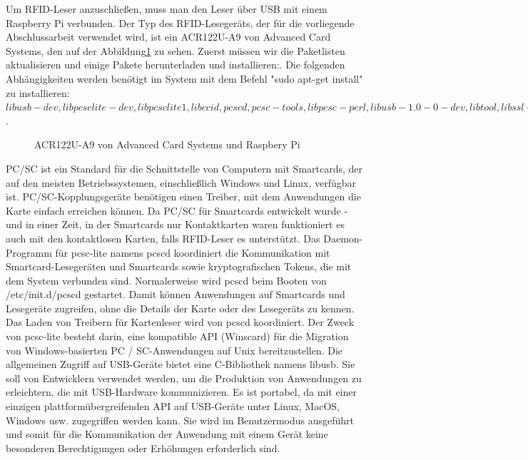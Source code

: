 Um RFID-Leser anzuschließen, muss man den Leser über USB mit einem Raspberry Pi verbunden. Der Typ des RFID-Lesegeräts, der für die vorliegende Abschlussarbeit verwendet wird, ist ein ACR122U-A9 von Advanced Card Systems\cite{website:7}, den auf der Abbildung\ref{fig:rfid_hard} zu sehen. Zuerst müssen wir die Paketlisten aktualisieren und einige Pakete herunterladen und installieren:\cite{website:6}. Die folgenden Abhängigkeiten werden benötigt im System mit dem Befehl "sudo apt-get install" zu installieren: $libusb-dev, libpcsclite-dev, libpcsclite1, libccid, pcscd, pcsc-tools, libpcsc-perl, libusb-1.0-0-dev, libtool, libssl-dev$.\\
\begin{figure}
	\caption{ACR122U-A9 von Advanced Card Systems und Raspbery Pi}
	\label{fig:rfid_hard}
\end{figure}
PC/SC ist ein Standard für die Schnittstelle von Computern mit Smartcards, der auf den meisten Betriebssystemen, einschließlich Windows und Linux, verfügbar ist. PC/SC-Kopplungsgeräte benötigen einen Treiber, mit dem Anwendungen die Karte einfach erreichen können. Da PC/SC für Smartcards entwickelt wurde - und in einer Zeit, in der Smartcards nur Kontaktkarten waren funktioniert es auch mit den kontaktlosen Karten, falls RFID-Leser es unterstützt. Das Daemon-Programm für pcsc-lite namens pcscd koordiniert die Kommunikation mit Smartcard-Lesegeräten und Smartcards sowie kryptografischen Tokens, die mit dem System verbunden sind. Normalerweise wird pcscd beim Booten von /etc/init.d/pcscd gestartet. Damit können Anwendungen auf Smartcards und Lesegeräte zugreifen, ohne die Details der Karte oder des Lesegeräts zu kennen. Das Laden von Treibern für Kartenleser wird von pcscd koordiniert. Der Zweck von pcsc-lite besteht darin, eine kompatible API (Winscard) für die Migration von Windows-basierten PC / SC-Anwendungen auf Unix bereitzustellen\cite{website:5}. Die allgemeinen Zugriff auf USB-Geräte bietet eine C-Bibliothek namens libusb.  Sie soll von Entwicklern verwendet werden, um die Produktion von Anwendungen zu erleichtern, die mit USB-Hardware kommunizieren. Es ist portabel, da mit einer einzigen plattformübergreifenden API auf USB-Geräte unter Linux, MacOS, Windows usw. zugegriffen werden kann. Sie wird im Benutzermodus ausgeführt und somit für die Kommunikation der Anwendung mit einem Gerät keine besonderen Berechtigungen oder Erhöhungen erforderlich sind.\cite{website:88}

